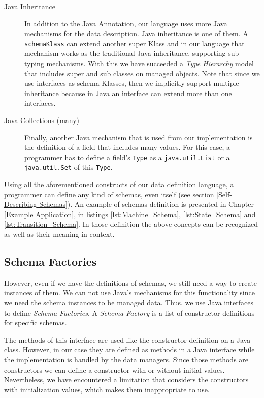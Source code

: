 \begin{description}
	\item [Java Inheritance] In addition to the Java Annotation, our language uses more Java mechanisms for the data description. 
	Java inheritance is one of them. 
	A \texttt{schemaKlass} can extend another super Klass and in our language that mechanism works as the traditional Java inheritance, supporting sub typing mechanisms.
	With this we have succeeded a \textit{Type Hierarchy} model that includes super and sub classes on managed objects.
	Note that since we use interfaces as schema Klasses, then we implicitly support multiple inheritance because in Java an interface can extend more than one interfaces.

	\item [Java Collections (many)] Finally, another Java mechanism that is used from our implementation is the definition of a field that includes many values.
	For this case, a programmer has to define a field's \texttt{Type} as a \texttt{java.util.List} or a \texttt{java.util.Set} of this \texttt{Type}.

\end{description}

Using all the aforementioned constructs of our data definition language, a programmer can define any kind of schemas, even itself (see section \ref{Self-Describing Schemas}).
An example of schemas definition is presented in Chapter \ref{Example Application}, in listings \ref{lst:Machine_Schema}, \ref{lst:State_Schema} and \ref{lst:Transition_Schema}.
In those definition the above concepts can be recognized as well as their meaning in context.

\subsection{Schema Factories}\label{Schema Factories}
However, even if we have the definitions of schemas, we still need a way to create instances of them.
We can not use Java's mechanisms for this functionality since we need the schema instances to be managed data.
Thus, we use Java interfaces to define \textit{Schema Factories}.
A \textit{Schema Factory} is a list of constructor definitions for specific schemas.

The methods of this interface are used like the constructor definition on a Java class.
However, in our case they are defined as methods in a Java interface while the implementation is handled by the data managers.
Since those methods are constructors we can define a constructor with or without initial values.
Nevertheless, we have encountered a limitation that considers the constructors with initialization values, which makes them inappropriate to use.

